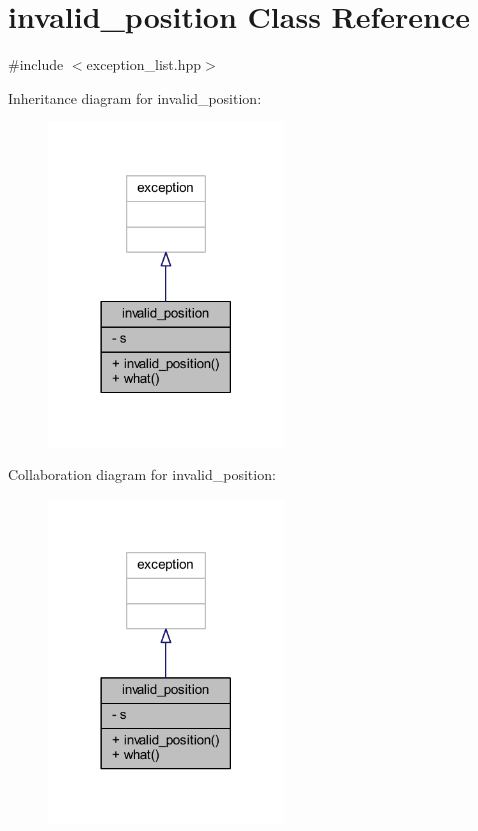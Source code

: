 \hypertarget{classinvalid__position}{}\section{invalid\+\_\+position Class Reference}
\label{classinvalid__position}


{\ttfamily \#include $<$exception\+\_\+list.\+hpp$>$}



Inheritance diagram for invalid\+\_\+position\+:
\nopagebreak
\begin{figure}[H]
\begin{center}
\leavevmode
\includegraphics[width=177pt]{classinvalid__position__inherit__graph}
\end{center}
\end{figure}


Collaboration diagram for invalid\+\_\+position\+:
\nopagebreak
\begin{figure}[H]
\begin{center}
\leavevmode
\includegraphics[width=177pt]{classinvalid__position__coll__graph}
\end{center}
\end{figure}
